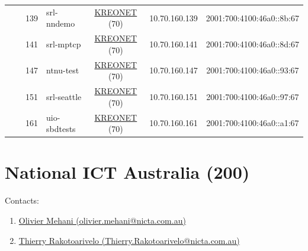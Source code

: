 \begin{small}
\begin{center}
\begin{longtable}{|c|c|c|c|c|c|c|c|}
  &  & \tiny{139} & \multicolumn{1}{|l|}{\tiny{srl-nndemo}} & \multicolumn{2}{|c|}{\tiny{\href{http://www.kreonet.net}{KREONET} (70)}} & \tiny{10.70.160.139} & \tiny{2001:700:4100:46a0::8b:67} \\* \cline{3-3}\cline{4-4}\cline{5-5}\cline{6-6}\cline{7-7}\cline{8-8}
  &  & \tiny{141} & \multicolumn{1}{|l|}{\tiny{srl-mptcp}} & \multicolumn{2}{|c|}{\tiny{\href{http://www.kreonet.net}{KREONET} (70)}} & \tiny{10.70.160.141} & \tiny{2001:700:4100:46a0::8d:67} \\* \cline{3-3}\cline{4-4}\cline{5-5}\cline{6-6}\cline{7-7}\cline{8-8}
  &  & \tiny{147} & \multicolumn{1}{|l|}{\tiny{ntnu-test}} & \multicolumn{2}{|c|}{\tiny{\href{http://www.kreonet.net}{KREONET} (70)}} & \tiny{10.70.160.147} & \tiny{2001:700:4100:46a0::93:67} \\* \cline{3-3}\cline{4-4}\cline{5-5}\cline{6-6}\cline{7-7}\cline{8-8}
  &  & \tiny{151} & \multicolumn{1}{|l|}{\tiny{srl-seattle}} & \multicolumn{2}{|c|}{\tiny{\href{http://www.kreonet.net}{KREONET} (70)}} & \tiny{10.70.160.151} & \tiny{2001:700:4100:46a0::97:67} \\* \cline{3-3}\cline{4-4}\cline{5-5}\cline{6-6}\cline{7-7}\cline{8-8}
  &  & \tiny{161} & \multicolumn{1}{|l|}{\tiny{uio-sbdtests}} & \multicolumn{2}{|c|}{\tiny{\href{http://www.kreonet.net}{KREONET} (70)}} & \tiny{10.70.160.161} & \tiny{2001:700:4100:46a0::a1:67} \\ \hline
\end{longtable}
\end{center}
\end{small}



\section{National ICT Australia (200)}
\label{sec:NICTA}

Contacts:
\begin{enumerate}
 \item {}\href{mailto:olivier.mehani@nicta.com.au}{Olivier Mehani (olivier.mehani@nicta.com.au)}
 \item {}\href{mailto:Thierry.Rakotoarivelo@nicta.com.au}{Thierry Rakotoarivelo (Thierry.Rakotoarivelo@nicta.com.au)}
\end{enumerate}

